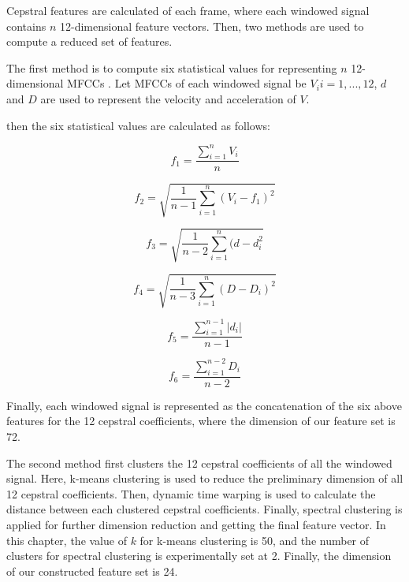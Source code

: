Cepstral features are calculated of each frame, where each windowed signal contains $n$ 12-dimensional feature vectors. Then, two methods are used to compute a reduced set of features. 

The first method is to compute six statistical values for representing $n$ 12-dimensional MFCCs \citep{dufour2013clusterized}. Let MFCCs of each windowed signal be $V_{i}{i=1,...,12}$, $d$ and $D$ are used to represent the velocity and acceleration of $V$.


then the six statistical values are calculated as follows:

\begin{equation}
f_{1} = \frac{\sum_{i=1}^{n}V_{i}}{n}
\end{equation}

 
 \begin{equation}
 f_{2} = \sqrt{\frac{1}{n-1}\sum_{i=1}^{n}(V_{i}-f_{1})^{2}}
 \end{equation}


\begin{equation}
f_{3} = \sqrt{\frac{1}{n-2}\sum_{i=1}^{n}(d-d_{i}^{2}}
\end{equation}


\begin{equation}
f_{4} = \sqrt{\frac{1}{n-3}\sum_{i=1}^{n}(D-D_{i})^{2}}
\end{equation}



\begin{equation}
f_{5} = \frac{\sum_{i=1}^{n-1}|d_{i}|}{n-1}
\end{equation}


\begin{equation}
f_{6} = \frac{\sum_{i=1}^{n-2}D_{i}}{n-2}
\end{equation}


Finally, each windowed signal is represented as the concatenation of the six above features for the 12 cepstral coefficients, where the dimension of our feature set is 72.


The second method first clusters the 12 cepstral coefficients of all the windowed signal. Here, k-means clustering is used to reduce the preliminary dimension of all 12 cepstral coefficients. 
Then, dynamic time warping is used to calculate the distance between each clustered cepstral coefficients. Finally, spectral clustering is applied for further dimension reduction and getting the final feature vector. In this chapter, the value of $k$ for k-means clustering is 50, and the number of clusters for spectral clustering is experimentally set at 2. Finally, the dimension of our constructed feature set is 24.



